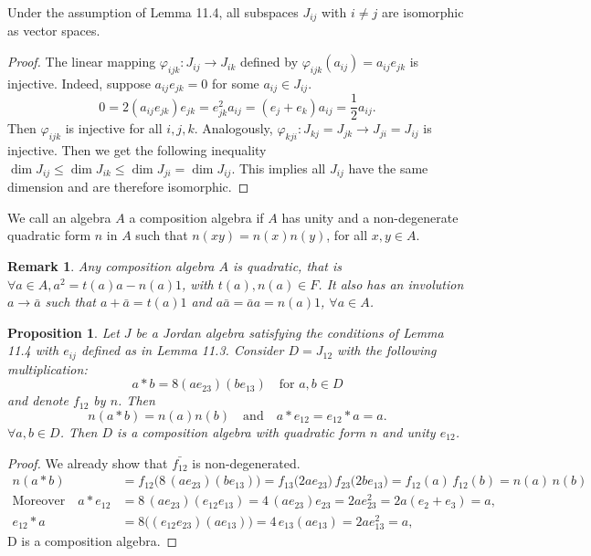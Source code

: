 \documentclass{article}
\newtheorem{proposition}[theorem]{Proposition}
\newtheorem{remark}[theorem]{Remark}
\begin{document}
\begin{lemma}  
Under the assumption of Lemma 11.4, all subspaces $J_{ij}$ with $i \ne j$ are isomorphic as vector spaces.  
\end{lemma}  

\begin{proof}  
The linear mapping $\varphi_{ijk}: J_{ij} \to J_{ik}$ defined by $\varphi_{ijk}(a_{ij}) = a_{ij} e_{jk}$ is injective. Indeed, suppose $a_{ij} e_{jk} = 0$ for some $a_{ij} \in J_{ij}$.  
\[ 0 = 2(a_{ij} e_{jk}) e_{jk} = e_{jk}^2 a_{ij} = (e_j+e_k) a_{ij} = \frac{1}{2} a_{ij}. \]  
Then $\varphi_{ijk}$ is injective for all $i,j,k$. Analogously, $\varphi_{kji}: J_{kj}=J_{jk} \to J_{ji}=J_{ij}$ is injective. Then we get the following inequality $\dim J_{ij} \le \dim J_{ik} \le \dim J_{ji} = \dim J_{ij}$. This implies all $J_{ij}$ have the same dimension and are therefore isomorphic.  
\end{proof} 

\begin{definition}  
We call an algebra $A$ a composition algebra if $A$ has unity and a non-degenerate quadratic form $n$ in $A$ such that $n(xy)=n(x)n(y)$, for all $x, y \in A$.  
\end{definition}  

\begin{remark}  
Any composition algebra $A$ is quadratic, that is $\forall a \in A, a^2 = t(a)a - n(a)1$, with $t(a), n(a) \in F$.  
It also has an involution $a \to \bar{a}$ such that $a+\bar{a} = t(a)1$ and $a\bar{a}=\bar{a}a=n(a)1$, $\forall a \in A$.  
\end{remark}

\begin{proposition}  
Let $J$ be a Jordan algebra satisfying the conditions of Lemma 11.4 with $e_{ij}$ defined as in Lemma 11.3. Consider $D=J_{12}$ with the following multiplication:  
\[ a*b = 8(ae_{23})(be_{13}) \quad \text{for } a,b \in D \]  
and denote $f_{12}$ by $n$. Then  
\[ n(a*b)=n(a)n(b) \quad \text{and} \quad a*e_{12} = e_{12}*a = a. \]  
$\forall a,b \in D$. Then $D$ is a composition algebra with quadratic form $n$ and unity $e_{12}$.  
\end{proposition}  

\begin{proof} 
We already show that $ \bar{f_{12}} $ is non-degenerated.  
\begin{align*}  
n(a*b)  
  &= f_{12}\big(8\,(a e_{23})(b e_{13})\big)  
   = f_{13}\big(2 a e_{23}\big)\,f_{23}\big(2 b e_{13}\big)  
   = f_{12}(a)\,f_{12}(b)  
   = n(a)\,n(b) \\
\text{Moreover}\quad  
a*e_{12}  
  &= 8\,(a e_{23})(e_{12} e_{13})  
   = 4\,(a e_{23}) e_{23}  
   = 2 a e_{23}^{2}  
   = 2 a(e_{2}+e_{3})  
   = a, \\
e_{12}*a  
  &= 8\big((e_{12} e_{23})(a e_{13})\big)  
   = 4\,e_{13}(a e_{13})  
   = 2ae_{13}^2=a,  
\end{align*}  
 D is a composition algebra.  
\end{proof}
\end{document}
